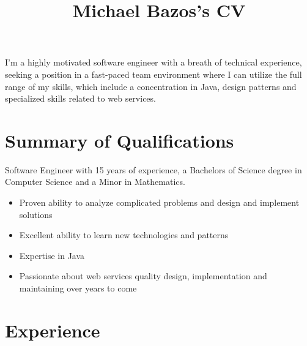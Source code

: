 \documentclass[a4paper,online]{adcv}
\title{Michael Bazos’s CV}
\begin{document}
I’m a highly motivated software engineer with a breath of technical experience, seeking a position in a fast-paced team environment where I can utilize the full range of my skills, which include a concentration in Java, design patterns and specialized skills related to web services.

\section{Summary of Qualifications}

\begin{adcvtabletwo}
Software Engineer with 15 years of experience, a Bachelors of Science degree in Computer Science and a Minor in Mathematics.
  \begin{itemize}
    \item Proven ability to analyze complicated problems and design and implement solutions
    \item Excellent ability to learn new technologies and patterns
    \item Expertise in Java
    \item Passionate about web services quality design, implementation and maintaining over years to come
  \end{itemize}
\end{adcvtabletwo}

\section{Experience}
\end{document}
